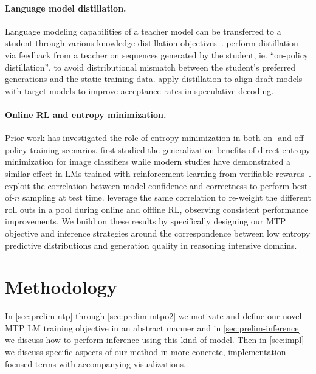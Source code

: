 \documentclass{article}
\theoremstyle{plain}
\theoremstyle{definition}
\theoremstyle{remark}
\begin{document}
\paragraph{Language model distillation.} Language modeling capabilities of a teacher model can be transferred to a student through various knowledge distillation objectives~\citep{kim2016sequence}. \citet{agarwal2024policy} perform distillation via feedback from a teacher on sequences generated by the student, ie. ``on-policy distillation'', to avoid distributional mismatch between the student's preferred generations and the static training data. \citet{zhou2023distillspec} apply distillation to align draft models with target models to improve acceptance rates in speculative decoding. 


\paragraph{Online RL and entropy minimization.}\label{sec:rel-ent-min}

Prior work has investigated the role of entropy minimization in both on- and off-policy training scenarios. \citet{wang2021tent} first studied the generalization benefits of direct entropy minimization for image classifiers while modern studies have demonstrated a similar effect in LMs trained with reinforcement learning from verifiable rewards~\cite{agarwal2025unreasonable,shao2024deepseekmathpushinglimitsmathematical}.
\citet{kang2025scalable} exploit the correlation between model confidence and correctness to perform best-of-$n$ sampling at test time. \citet{fu2025deep} leverage the same correlation to re-weight the different roll outs in a pool during online and offline RL, observing consistent performance improvements. 
We build on these results by specifically designing our MTP objective and inference strategies around the correspondence between low entropy predictive distributions and generation quality in reasoning intensive domains.

\section{Methodology}\label{sec:prelim}

In \cref{sec:prelim-ntp} through \cref{sec:prelim-mtpo2} we motivate and define our novel MTP LM training objective in an abstract manner and in \cref{sec:prelim-inference} we discuss how to perform inference using this kind of model. Then in \cref{sec:impl} we discuss specific aspects of our method in more concrete, implementation focused terms with accompanying visualizations.
\end{document}
